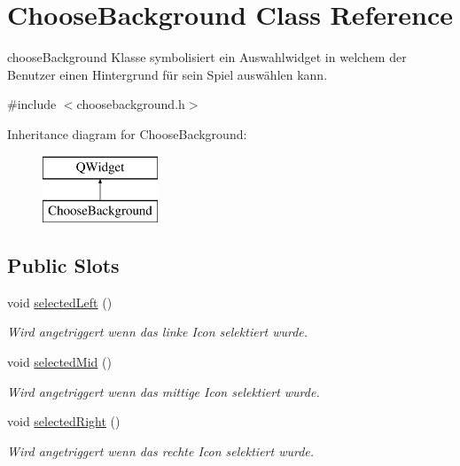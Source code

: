 \hypertarget{class_choose_background}{}\section{Choose\+Background Class Reference}
\label{class_choose_background}


choose\+Background Klasse symbolisiert ein Auswahlwidget in welchem der Benutzer einen Hintergrund für sein Spiel auswählen kann.  




{\ttfamily \#include $<$choosebackground.\+h$>$}

Inheritance diagram for Choose\+Background\+:\begin{figure}[H]
\begin{center}
\leavevmode
\includegraphics[height=2.000000cm]{class_choose_background}
\end{center}
\end{figure}
\subsection*{Public Slots}
\begin{DoxyCompactItemize}
\item 
\hypertarget{class_choose_background_a134632704516ff01d21147a6f7238b8f}{}void \hyperlink{class_choose_background_a134632704516ff01d21147a6f7238b8f}{selected\+Left} ()\label{class_choose_background_a134632704516ff01d21147a6f7238b8f}

\begin{DoxyCompactList}\small\item\em Wird angetriggert wenn das linke Icon selektiert wurde. \end{DoxyCompactList}\item 
\hypertarget{class_choose_background_a9fa9d22a3cfd437307117bb32036b731}{}void \hyperlink{class_choose_background_a9fa9d22a3cfd437307117bb32036b731}{selected\+Mid} ()\label{class_choose_background_a9fa9d22a3cfd437307117bb32036b731}

\begin{DoxyCompactList}\small\item\em Wird angetriggert wenn das mittige Icon selektiert wurde. \end{DoxyCompactList}\item 
\hypertarget{class_choose_background_afc6ef25b1b6e1ed1e9842be71542a092}{}void \hyperlink{class_choose_background_afc6ef25b1b6e1ed1e9842be71542a092}{selected\+Right} ()\label{class_choose_background_afc6ef25b1b6e1ed1e9842be71542a092}

\begin{DoxyCompactList}\small\item\em Wird angetriggert wenn das rechte Icon selektiert wurde. \end{DoxyCompactList}\end{DoxyCompactItemize}
